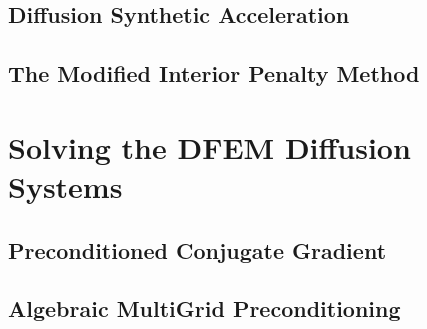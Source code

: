 \documentclass[preprint,review,12pt]{elsarticle}
\begin{document}
\subsection{Diffusion Synthetic Acceleration} \label{sec::accel_DSA}

\subsection{The Modified Interior Penalty Method} \label{sec::accel_MIP}



\section{Solving the DFEM Diffusion Systems} \label{sec::solving}

\subsection{Preconditioned Conjugate Gradient} \label{sec::solving_PCG}

\subsection{Algebraic MultiGrid Preconditioning} \label{sec::solving_AMG}

\end{document}
